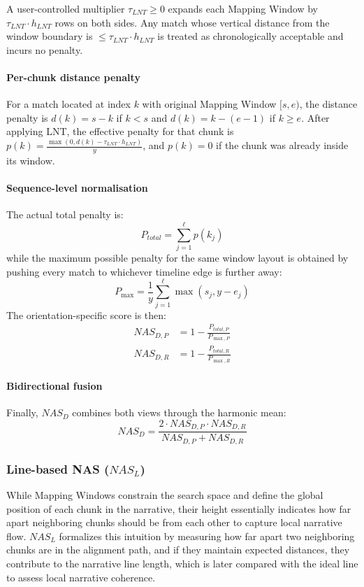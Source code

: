 \documentclass[main.tex]{subfiles}
\begin{document}
A user-controlled multiplier $\tau_{LNT} \geq 0$ expands each Mapping Window by $\tau_{LNT} \cdot h_{LNT}$ rows on both sides. Any match whose vertical distance from the window boundary is $\leq \tau_{LNT} \cdot h_{LNT}$ is treated as chronologically acceptable and incurs no penalty.

\paragraph{Per-chunk distance penalty}
For a match located at index $k$ with original Mapping Window $[s, e)$, the distance penalty is $d(k) = s - k$ if $k < s$ and $d(k) = k - (e - 1)$ if $k \geq e$. After applying LNT, the effective penalty for that chunk is $p(k) = \frac{\max(0, d(k) - \tau_{LNT} \cdot h_{LNT})}{y}$,
and $p(k) = 0$ if the chunk was already inside its window.

\paragraph{Sequence-level normalisation}
The actual total penalty is:
\begin{equation}
P_{total} = \sum_{j=1}^{\ell} p(k_j)
\end{equation}
while the maximum possible penalty for the same window layout is obtained by pushing every match to whichever timeline edge is further away:
\begin{equation}
P_{\max} = \frac{1}{y} \sum_{j=1}^{\ell} \max(s_j, y - e_j)
\end{equation}
The orientation-specific score is then:
\begin{align}
NAS_{D,P} &= 1 - \frac{P_{total,P}}{P_{\max,P}} \\
NAS_{D,R} &= 1 - \frac{P_{total,R}}{P_{\max,R}}
\end{align}

\paragraph{Bidirectional fusion}
Finally, $NAS_D$ combines both views through the harmonic mean:
\begin{equation}
NAS_D = \frac{2 \cdot NAS_{D,P} \cdot NAS_{D,R}}{NAS_{D,P} + NAS_{D,R}}
\end{equation}

\subsubsection{Line-based NAS ($NAS_L$)}
While Mapping Windows constrain the search space and define the global position of each chunk in the narrative, their height essentially indicates how far apart neighboring chunks should be from each other to capture local narrative flow. $NAS_L$ formalizes this intuition by measuring how far apart two neighboring chunks are in the alignment path, and if they maintain expected distances, they contribute to the narrative line length, which is later compared with the ideal line to assess local narrative coherence.
\end{document}
